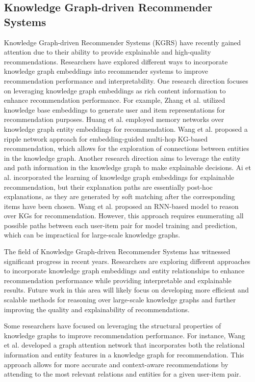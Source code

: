 \documentclass[11pt]{article}
\begin{document}
\subsection{Knowledge Graph-driven Recommender Systems}
Knowledge Graph-driven Recommender Systems (KGRS) have recently gained attention due to their ability to provide explainable and high-quality recommendations. Researchers have explored different ways to incorporate knowledge graph embeddings into recommender systems to improve recommendation performance and interpretability.
One research direction focuses on leveraging knowledge graph embeddings as rich content information to enhance recommendation performance. For example, Zhang et al. \cite{zhang2016collaborative} utilized knowledge base embeddings to generate user and item representations for recommendation purposes. Huang et al. \cite{huang2018improving} employed memory networks over knowledge graph entity embeddings for recommendation. Wang et al. \cite{wang2018ripplenet} proposed a ripple network approach for embedding-guided multi-hop KG-based recommendation, which allows for the exploration of connections between entities in the knowledge graph.
Another research direction aims to leverage the entity and path information in the knowledge graph to make explainable decisions. Ai et al. \cite{a11090137} incorporated the learning of knowledge graph embeddings for explainable recommendation, but their explanation paths are essentially post-hoc explanations, as they are generated by soft matching after the corresponding items have been chosen. Wang et al. \cite{wang2019explainable} proposed an RNN-based model to reason over KGs for recommendation. However, this approach requires enumerating all possible paths between each user-item pair for model training and prediction, which can be impractical for large-scale knowledge graphs.

The field of Knowledge Graph-driven Recommender Systems has witnessed significant progress in recent years. Researchers are exploring different approaches to incorporate knowledge graph embeddings and entity relationships to enhance recommendation performance while providing interpretable and explainable results. Future work in this area will likely focus on developing more efficient and scalable methods for reasoning over large-scale knowledge graphs and further improving the quality and explainability of recommendations.

Some researchers have focused on leveraging the structural properties of knowledge graphs to improve recommendation performance. For instance, Wang et al. \cite{wang2019neural} developed a graph attention network that incorporates both the relational information and entity features in a knowledge graph for recommendation. This approach allows for more accurate and context-aware recommendations by attending to the most relevant relations and entities for a given user-item pair.
\end{document}
